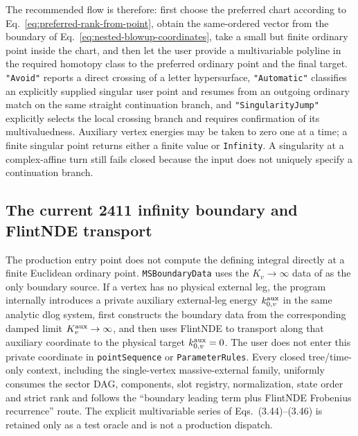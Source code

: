 \documentclass[11pt,a4paper]{article}
\begin{document}
The recommended flow is therefore: first choose the preferred chart according to Eq.~\eqref{eq:preferred-rank-from-point}, obtain the same-ordered vector from the boundary of Eq.~\eqref{eq:nested-blowup-coordinates}, take a small but finite ordinary point inside the chart, and then let the user provide a multivariable polyline in the required homotopy class to the preferred ordinary point and the final target.  \texttt{"Avoid"} reports a direct crossing of a letter hypersurface, \texttt{"Automatic"} classifies an explicitly supplied singular user point and resumes from an outgoing ordinary match on the same straight continuation branch, and \texttt{"SingularityJump"} explicitly selects the local crossing branch and requires confirmation of its multivaluedness.  Auxiliary vertex energies may be taken to zero one at a time; a finite singular point returns either a finite value or \texttt{Infinity}.  A singularity at a complex-affine turn still fails closed because the input does not uniquely specify a continuation branch.

\subsection{The current 2411 infinity boundary and FlintNDE transport}

The production entry point does not compute the defining integral directly at a finite Euclidean ordinary point. \texttt{MSBoundaryData} uses the $K_v\to\infty$ data of \cite{Chen:2024jms} as the only boundary source. If a vertex has no physical external leg, the program internally introduces a private auxiliary external-leg energy $k_{0,v}^{\rm aux}$ in the same analytic dlog system, first constructs the boundary data from the corresponding damped limit $K_v^{\rm aux}\to\infty$, and then uses FlintNDE to transport along that auxiliary coordinate to the physical target $k_{0,v}^{\rm aux}=0$. The user does not enter this private coordinate in \texttt{pointSequence} or \texttt{ParameterRules}. Every closed tree/time-only context, including the single-vertex massive-external family, uniformly consumes the sector DAG, components, slot registry, normalization, state order and strict rank and follows the ``boundary leading term plus FlintNDE Frobenius recurrence'' route. The explicit multivariable series of Eqs.~(3.44)--(3.46) is retained only as a test oracle and is not a production dispatch.
\end{document}
